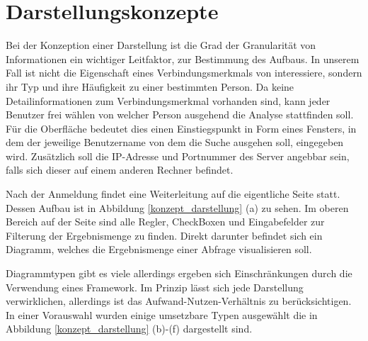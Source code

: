 \section{Darstellungskonzepte}
\label{ch:Konzeption:sec:Darstellungskonzepte}

Bei der Konzeption einer Darstellung ist die Grad der Granularität von Informationen ein wichtiger Leitfaktor, zur Bestimmung des Aufbaus. In unserem Fall ist nicht die Eigenschaft eines Verbindungsmerkmals von interessiere, sondern ihr Typ und ihre Häufigkeit zu einer bestimmten Person. Da keine Detailinformationen zum Verbindungsmerkmal vorhanden sind, kann jeder Benutzer frei wählen von welcher Person ausgehend die Analyse stattfinden soll. Für die Oberfläche bedeutet dies einen Einstiegspunkt in Form eines Fensters, in dem der jeweilige Benutzername von dem die Suche ausgehen soll, eingegeben wird. Zusätzlich soll die IP-Adresse und Portnummer des Server angebbar sein, falls sich dieser auf einem anderen Rechner befindet.

Nach der Anmeldung findet eine Weiterleitung auf die eigentliche Seite statt. Dessen Aufbau ist in Abbildung \ref{konzept_darstellung} (a) zu sehen. Im oberen Bereich auf der Seite sind alle Regler, CheckBoxen und Eingabefelder zur Filterung der Ergebnismenge zu finden. Direkt darunter befindet sich ein Diagramm, welches die Ergebnismenge einer Abfrage visualisieren soll.


Diagrammtypen gibt es viele allerdings ergeben sich Einschränkungen durch die Verwendung eines Framework. Im Prinzip lässt sich jede Darstellung verwirklichen, allerdings ist das Aufwand-Nutzen-Verhältnis zu berücksichtigen. In einer Vorauswahl wurden einige umsetzbare Typen ausgewählt die in Abbildung \ref{konzept_darstellung} (b)-(f) dargestellt sind. 

